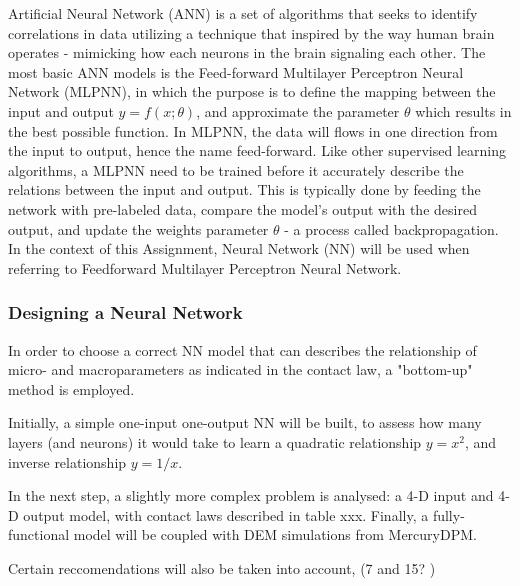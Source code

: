 Artificial Neural Network (ANN) is a set of algorithms that seeks to identify correlations in data utilizing a technique that inspired by the way human brain operates - mimicking how each neurons in the brain signaling each other. The most basic ANN models is the Feed-forward Multilayer Perceptron Neural Network (MLPNN), in which the purpose is to define the mapping between the input and output \(y = f(x;\theta)\), and approximate the parameter \(\theta\) which results in the best possible function. In MLPNN, the data will flows in one direction from the input to output, hence the name feed-forward. Like other supervised learning algorithms, a MLPNN need to be trained before it  accurately describe the relations between the input and output. This is typically done by feeding the network with pre-labeled data, compare the model's output with the desired output, and update the weights parameter \(\theta\) - a process called backpropagation. In the context of this Assignment, Neural Network (NN) will be used when referring to Feedforward Multilayer Perceptron Neural Network. 



\subsubsection{Designing a Neural Network}
In order to choose a correct NN model that can describes the relationship of micro- and macroparameters as indicated in the contact law, a "bottom-up" method is employed.

Initially, a simple one-input one-output NN will be built, to assess how many layers (and neurons) it would take to learn a quadratic relationship \(y = x^2\), and inverse relationship \(y = 1/x\).

In the next step, a slightly more complex problem is analysed: a 4-D input and 4-D output model, with contact laws described in table xxx. Finally, a fully-functional model will be coupled with DEM simulations from MercuryDPM.   

Certain reccomendations will also be taken into account, (7 and 15? )


